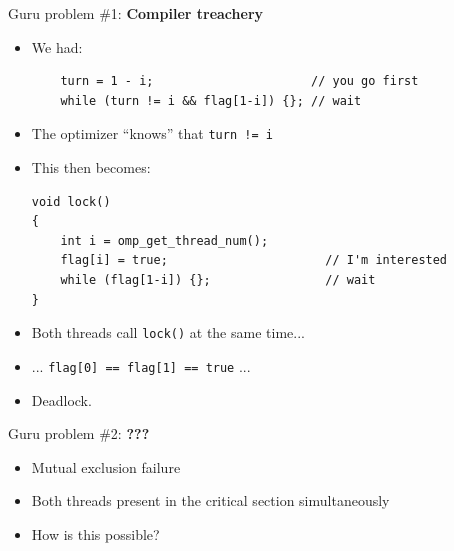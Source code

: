 \documentclass[xcolor={x11names,svgnames},x11names,svgnames]{beamer}
\begin{document}
\begin{frame}[label=peterson_report1, fragile=singleslide]

  \begin{block}{Guru problem \#1: \textbf{Compiler treachery}}
    \begin{itemize}
      \item We had:
    \begin{verbatim}
    turn = 1 - i;                      // you go first
    while (turn != i && flag[1-i]) {}; // wait
\end{verbatim}

\item The optimizer ``knows'' that \texttt{turn != i}
\item This then becomes:
  \begin{verbatim}
void lock()
{
    int i = omp_get_thread_num();
    flag[i] = true;                      // I'm interested
    while (flag[1-i]) {};                // wait
}
\end{verbatim}
\item Both threads call \texttt{lock()} at the same time...
\item ... \texttt{flag[0] == flag[1] == true} ...
\item Deadlock.
\end{itemize}
\end{block}
\end{frame}


\begin{frame}[label=peterson_report2, fragile=singleslide]

  \begin{block}{Guru problem \#2: \textbf{???}}
    \begin{itemize}
    \item Mutual exclusion failure
    \item Both threads present in the critical section simultaneously
    \item How is this possible?
    \end{itemize}
  \end{block}
\end{frame}

\end{document}
